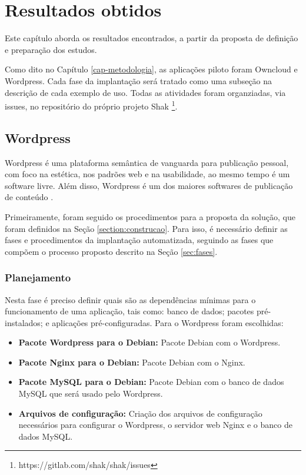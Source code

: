 \chapter{Resultados obtidos}
\label{cap-resultados}
Este capítulo aborda os resultados encontrados, a partir da proposta de
definição e preparação dos estudos. 

Como dito no Capítulo \ref{cap-metodologia}, as aplicações piloto foram Owncloud e Wordpress. 
Cada fase da implantação será tratado como uma 
subseção na descrição de cada exemplo de uso. Todas as atividades foram organziadas,
via issues, no repositório do próprio projeto Shak 
\footnote{https://gitlab.com/shak/shak/issues}.

\section{Wordpress}
\label{sub:wordpress}

Wordpress é uma plataforma semântica de vanguarda para publicação pessoal, 
com foco na estética, nos padrões web e na usabilidade, ao mesmo tempo é 
um software livre. Além disso, Wordpress é um dos maiores softwares de 
publicação de conteúdo \cite{wordpress}. 

Primeiramente, foram seguido os procedimentos para a proposta da solução, que foram
 definidos na Seção \ref{section:construcao}. Para isso, é
necessário definir as fases e procedimentos da implantação automatizada,
seguindo as fases que compõem o processo proposto descrito na Seção \ref{sec:fases}.

\subsection{Planejamento}

Nesta fase é preciso definir quais são as dependências mínimas
para o funcionamento de uma aplicação, tais como: banco de dados; pacotes
pré-instalados; e aplicações pré-configuradas. Para o Wordpress foram escolhidas:

\begin{itemize}
   \item \textbf{Pacote Wordpress para o Debian:} Pacote Debian com o Wordpress.
   \item \textbf{Pacote Nginx para o Debian:} Pacote Debian com o Nginx.
   \item \textbf{Pacote MySQL para o Debian:} Pacote Debian com o banco de dados MySQL
   que será usado pelo Wordpress.
   \item \textbf{Arquivos de configuração:} Criação dos arquivos de configuração
   necessários para configurar o Wordpress, o servidor web Nginx e o banco de dados
   MySQL.
\end{itemize}

